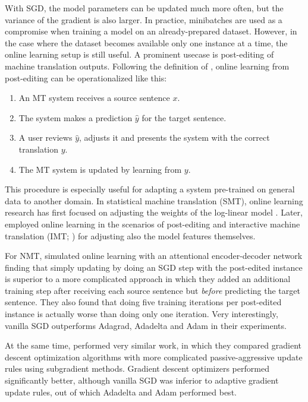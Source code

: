 With SGD, the model parameters can be updated much more often, but the variance
of the gradient is also larger. In practice, minibatches are used as a
compromise when training a model on an already-prepared dataset. However, in the
case where the dataset becomes available only one instance at a time, the online
learning setup is still useful. A prominent usecase is post-editing of machine
translation outputs. Following the definition of \textcite{ortiz-martinez-2016},
online learning from post-editing can be operationalized like this:

\begin{enumerate}
\item An MT system receives a source sentence \(x\).
\item The system makes a prediction \(\hat{y}\) for the target sentence.
\item A user reviews \(\hat{y}\), adjusts it and presents the system with the
  correct translation \(y\).
\item The MT system is updated by learning from \(y\).
\end{enumerate}

This procedure is especially useful for adapting a system pre-trained on general
data to another domain. In statistical machine translation (SMT), online
learning research has first focused on adjusting the weights of the log-linear
model \parencites(e.g.)(){liang-2006}{arun-2007}{watanabe-2007}. Later,
\textcites{ortiz-martinez-2010}{ortiz-martinez-2016} employed online learning in
the scenarios of post-editing and interactive machine translation (IMT;
\cites{casacuberta-2009}{barrachina-2009}) for adjusting also the model features
themselves.

For NMT, \textcite{turchi-2017} simulated online learning with an attentional
encoder-decoder network finding that simply updating by doing an SGD step with
the post-edited instance is superior to a more complicated approach in which
they added an additional training step after receiving each source sentence but
\emph{before} predicting the target sentence. They also found that doing five
training iterations per post-edited instance is actually worse than doing only
one iteration. Very interestingly, vanilla SGD outperforms Adagrad, Adadelta and
Adam in their experiments. %

At the same time, \textcite{peris-2017} performed very similar work, in which
they compared gradient descent optimization algorithms with more complicated
passive-aggressive update rules using subgradient methods. Gradient descent
optimizers performed significantly better, although vanilla SGD was inferior to
adaptive gradient update rules, out of which Adadelta and Adam performed best.

